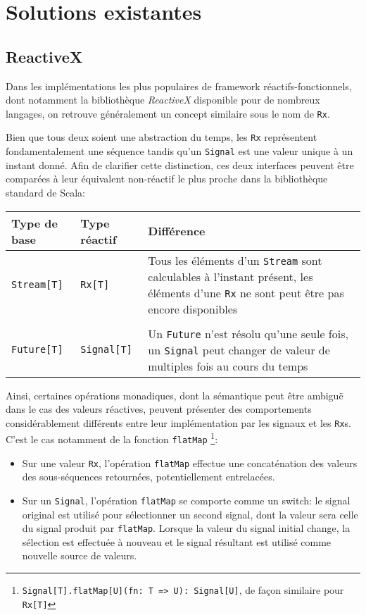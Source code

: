 \section{Solutions existantes}

\subsection{ReactiveX}
Dans les implémentations les plus populaires de framework réactifs-fonctionnels, dont notamment la bibliothèque \emph{ReactiveX} disponible pour de nombreux langages, on retrouve généralement un concept similaire sous le nom de \texttt{Rx}.

Bien que tous deux soient une abstraction du temps, les \texttt{Rx} représentent fondamentalement une séquence tandis qu'un \texttt{Signal} est une valeur unique à un instant donné. Afin de clarifier cette distinction, ces deux interfaces peuvent être comparées à leur équivalent non-réactif le plus proche dans la bibliothèque standard de Scala:

\begin{table}[H]
	\begin{tabular}{@{}p{2.5cm}p{2.5cm}p{\dimexpr\textwidth-6cm\relax}@{}}
		\toprule
		Type de base & Type réactif & Différence \\ \midrule
		\texttt{Stream[T]} & \texttt{Rx[T]} & Tous les éléments d'un \texttt{Stream} sont calculables à l'instant présent, les éléments d'une \texttt{Rx} ne sont peut être pas encore disponibles \\
		&  & \\
		\texttt{Future[T]} & \texttt{Signal[T]} & Un \texttt{Future} n'est résolu qu'une seule fois, un \texttt{Signal} peut changer de valeur de multiples fois au cours du temps \\ \bottomrule
	\end{tabular}
\end{table}

Ainsi, certaines opérations monadiques, dont la sémantique peut être ambiguë dans le cas des valeurs réactives, peuvent présenter des comportements considérablement différents entre leur implémentation par les signaux et les \texttt{Rx}s. C'est le cas notamment de la fonction \texttt{flatMap}
\footnote{\texttt{Signal[T].flatMap[U](fn: T => U): Signal[U]}, de façon similaire pour \texttt{Rx[T]}}:

\begin{itemize}
	\item Sur une valeur \texttt{Rx}, l'opération \texttt{flatMap} effectue une concaténation des valeurs des sous-séquences retournées, potentiellement entrelacées.
	\item Sur un \texttt{Signal}, l'opération \texttt{flatMap} se comporte comme un switch: le signal original est utilisé pour sélectionner un second signal, dont la valeur sera celle du signal produit par \texttt{flatMap}. Lorsque la valeur du signal initial change, la sélection est effectuée à nouveau et le signal résultant est utilisé comme nouvelle source de valeurs.
\end{itemize}

